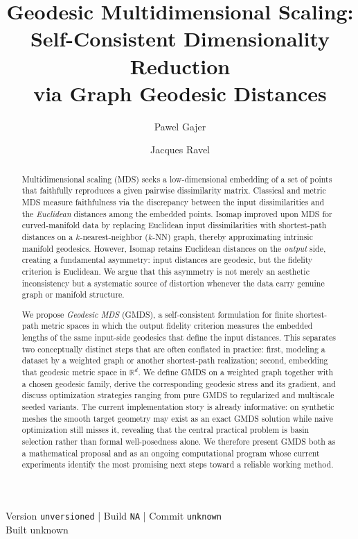 \documentclass[11pt]{article}
\newcommand{\R}{\mathbb{R}}
\theoremstyle{definition}
\theoremstyle{plain}
\theoremstyle{remark}
\providecommand{\manuscriptversion}{unversioned}
\providecommand{\manuscriptbuildnumber}{NA}
\providecommand{\manuscriptcommit}{unknown}
\providecommand{\manuscriptbuilddatetime}{unknown}
\begin{document}
\title{Geodesic Multidimensional Scaling:\\
       Self-Consistent Dimensionality Reduction\\ via Graph Geodesic Distances}

\author{Pawel Gajer \and Jacques Ravel}
\date{}

\maketitle
\thispagestyle{firstpage}
\begin{center}
\footnotesize
Version \texttt{\manuscriptversion} \quad | \quad Build
\texttt{\manuscriptbuildnumber} \quad | \quad Commit
\texttt{\manuscriptcommit}\\
Built \manuscriptbuilddatetime
\end{center}
\vspace{0.6em}

\begin{abstract}
Multidimensional scaling (MDS) seeks a low-dimensional embedding of
a set of points that faithfully reproduces a given pairwise dissimilarity
matrix.  Classical and metric MDS measure faithfulness via the discrepancy
between the input dissimilarities and the \emph{Euclidean} distances among
the embedded points.  Isomap improved upon MDS for curved-manifold data by
replacing Euclidean input dissimilarities with shortest-path distances on a
$k$-nearest-neighbor ($k$-NN) graph, thereby approximating intrinsic
manifold geodesics.  However, Isomap retains Euclidean distances on the
\emph{output} side, creating a fundamental asymmetry: input distances are
geodesic, but the fidelity criterion is Euclidean.  We argue that this
asymmetry is not merely an aesthetic inconsistency but a systematic source
of distortion whenever the data carry genuine graph or manifold structure.

We propose \emph{Geodesic MDS} (GMDS), a self-consistent formulation for
finite shortest-path metric spaces in which the output fidelity criterion
measures the embedded lengths of the same input-side geodesics that define
the input distances.  This separates two conceptually distinct steps that are
often conflated in practice: first, modeling a dataset by a weighted graph or
another shortest-path realization; second, embedding that geodesic metric
space in $\R^d$.  We define GMDS on a weighted graph together with a chosen
geodesic family, derive the corresponding geodesic stress and its gradient,
and discuss optimization strategies ranging from pure GMDS to regularized and
multiscale seeded variants.  The current implementation story is already
informative: on synthetic meshes the smooth target geometry may exist as an
exact GMDS solution while naive optimization still misses it, revealing that
the central practical problem is basin selection rather than formal
well-posedness alone.  We therefore present GMDS both as a mathematical
proposal and as an ongoing computational program whose current experiments
identify the most promising next steps toward a reliable working method.
\end{abstract}
\end{document}

